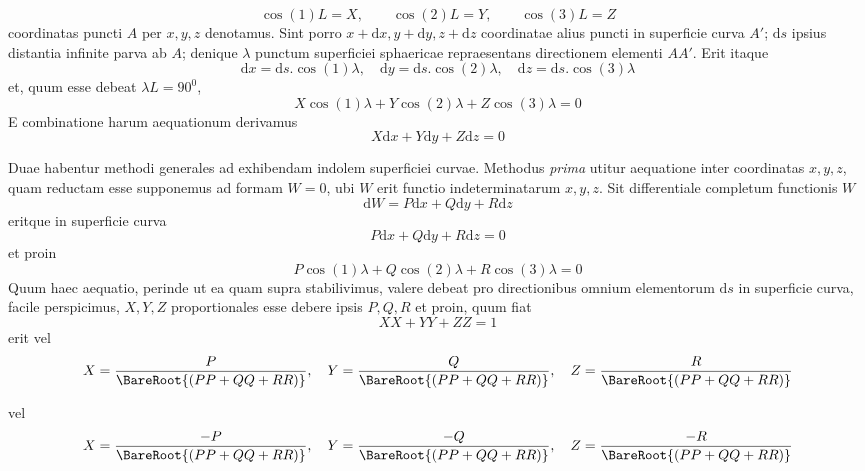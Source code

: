 %
\[
\cos(1)L=X,\qquad\cos(2)L=Y,\qquad\cos(3)L=Z
\]
\noindent coordinatas puncti \(A\) per \(x,y,z\) denotamus. Sint porro \(x+\mathrm{d}x,y+\mathrm{d}y,z+\mathrm{d}z\) coordinatae alius puncti in superficie curva \(A'\); \(\mathrm{d}s\) ipsius distantia infinite parva ab \(A\); denique \(\lambda\) punctum superficiei sphaericae repraesentans directionem elementi \(AA'\). Erit itaque
\[
\mathrm{d}x=\mathrm{d}s\mathord{.}\cos(1)\lambda,\quad\mathrm{d}y=\mathrm{d}s\mathord{.}\cos(2)\lambda,\quad\mathrm{d}z=\mathrm{d}s\mathord{.}\cos(3)\lambda
\]
\noindent et, quum esse debeat \(\lambda L=90^0\),
\[
X\cos(1)\lambda+Y\cos(2)\lambda+Z\cos(3)\lambda=0
\]
\noindent E combinatione harum aequationum derivamus
\[
X\mathrm{d}x+Y\mathrm{d}y+Z\mathrm{d}z=0
\]
\par\indent Duae habentur methodi generales ad exhibendam indolem superficiei curvae. Methodus \textit{prima} utitur aequatione inter coordinatas \(x,y,z\), quam reductam esse supponemus ad formam \(W=0\), ubi \(W\) erit functio indeterminatarum \(x,y,z\). Sit differentiale completum functionis \(W\)
\[
\mathrm{d}W=P\mathrm{d}x+Q\mathrm{d}y+R\mathrm{d}z
\]
\noindent eritque in superficie curva
\[
P\mathrm{d}x+Q\mathrm{d}y+R\mathrm{d}z=0
\]
\noindent et proin
\[
P\cos(1)\lambda+Q\cos(2)\lambda+R\cos(3)\lambda=0
\]
\noindent Quum haec aequatio, perinde ut ea quam supra stabilivimus, valere debeat pro directionibus omnium elementorum \(\mathrm{d}s\) in superficie curva, facile perspicimus, \(X,Y,Z\) proportionales esse debere ipsis \(P,Q,R\) et proin, quum fiat
\[
XX+YY+ZZ=1
\]
\noindent erit vel
\begingroup\small
\[
X=\frac{P}{\BareRoot{(PP+QQ+RR)}},\quad Y=\frac{Q}{\BareRoot{(PP+QQ+RR)}},\quad Z=\frac{R}{\BareRoot{(PP+QQ+RR)}}
\]\endgroup

\noindent vel
\begingroup\small
\[
X=\frac{-P}{\BareRoot{(PP+QQ+RR)}},\quad Y=\frac{-Q}{\BareRoot{(PP+QQ+RR)}},\quad Z=\frac{-R}{\BareRoot{(PP+QQ+RR)}}
\]\endgroup

